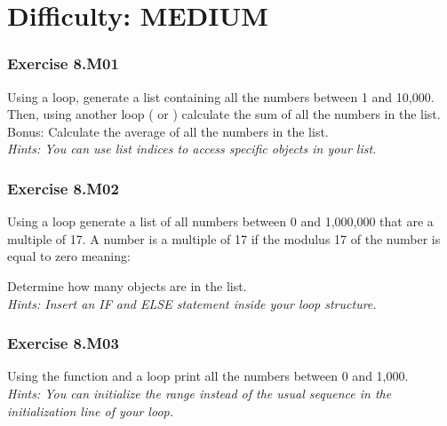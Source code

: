 \newpage
\section{Difficulty: MEDIUM}

\subsubsection*{Exercise 8.M01}
Using a {} loop, generate a list containing all the numbers between 1 and 10,000. Then, using another loop ({} or {}) calculate the sum of all the numbers in the list.\\
Bonus:
Calculate the average of all the numbers in the list.\\


\textit{Hints:
You can use list indices to access specific objects in your list.}\\[1cm]



\subsubsection*{Exercise 8.M02}
Using a {} loop generate a list of all numbers between 0 and 1,000,000 that are a
multiple of 17. A number is a multiple of 17 if the modulus 17 of the number is equal to zero
meaning:
\begin{center}
	{}
\end{center}
Determine how many objects are in the list.\\

\textit{Hints:
Insert an IF and ELSE statement inside your loop structure.}\\[1cm]



\subsubsection*{Exercise 8.M03}
Using the {} function and a {} loop print all the numbers between 0 and 1,000.\\

\textit{Hints:
You can initialize the range instead of the usual sequence in the initialization line of your
{} loop.}\\[1cm]


